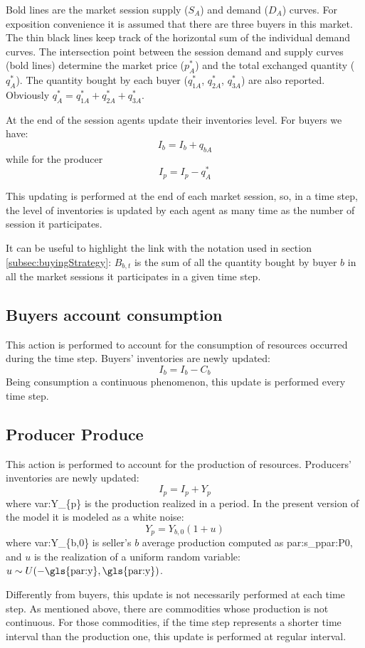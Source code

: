 \documentclass{article}
\begin{document}
\vskip5mm
Bold lines are the market session supply ($S_A$) and demand ($D_A$) curves. For exposition convenience it is assumed that there are three buyers in this market. The thin black lines keep track of the horizontal sum of the individual demand curves. The intersection point between the session demand and supply curves (bold lines) determine the market price ($p^*_A$) and the total exchanged quantity ($q^*_A$). The quantity bought by each buyer ($q^*_{1A}$, $q^*_{2A}$, $q^*_{3A}$) are also reported. Obviously $q^*_A=q^*_{1A}+q^*_{2A}+q^*_{3A}$.

At the end of the session agents update their inventories level.
For buyers we have:
\[ I_b=I_b+q_{bA}\]
while for the producer
\[ I_p=I_p-q^*_A\]

This updating is performed at the end of each market session, so, in a time step, the level of inventories is updated by each agent as many time as the number of session it participates.

It can be useful to highlight the link with the notation used in section \ref{subsec:buyingStrategy}: $B_{b,t}$ is the sum of all the quantity bought by buyer $b$ in all the market sessions it participates in a given time step.   


\subsection{Buyers account consumption}

This action is performed to account for the consumption of resources occurred during the time step. Buyers' inventories are newly updated:
\[
I_b=I_b-C_b
\]
Being consumption a continuous phenomenon, this update is performed every time step.


\subsection{Producer Produce}

This action is performed to account for the production of resources. Producers' inventories are newly updated:
\[
I_p=I_p+Y_p
\]
where \gls{var:Y_{p}} is the production realized in a period. In the present version of the model it is modeled as a white noise:
\[
	Y_p=Y_{b,0}(1+u)
\]
where \gls{var:Y_{b,0}} is seller's $b$ average production computed as \gls{par:s_p}\gls{par:P0},  
and $u$ is the realization of a uniform random variable: $u\sim U(-\textnormal{\gls{par:y}},\textnormal{\gls{par:y}})$.

Differently from buyers, this update is not necessarily performed at each time step.
As mentioned above, there are commodities whose production is not continuous. For those commodities, if the time step represents a shorter time interval than the production one, this update is performed at regular interval.
\end{document}
